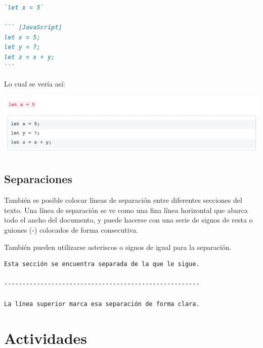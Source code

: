 \begin{lstlisting}[language=Markdown]
`let x = 5`

``` [JavaScript]
let x = 5;
let y = 7;
let z = x + y;
```
\end{lstlisting}

Lo cual se vería así:

\includegraphics[scale=0.63]{anexos/1_lenguajes_marcado/1_markdown/imagenes/md_codigo.png}

\subsection*{Separaciones}

También es posible colocar líneas de separación entre diferentes secciones del
texto. Una línea de separación se ve como una fina línea horizontal que abarca
todo el ancho del documento, y puede hacerse con una serie de signos de resta o
guiones (-) colocados de forma consecutiva.

También pueden utilizarse asteriscos o signos de igual para la separación.

\begin{lstlisting}[language=Markdown]
Esta sección se encuentra separada de la que le sigue.

------------------------------------------------------

La línea superior marca esa separación de forma clara.
\end{lstlisting}


\section{Actividades}

